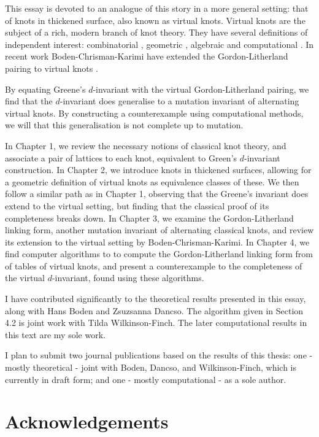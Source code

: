 \documentclass[12pt]{report}
\theoremstyle{upright}
\begin{document}
This essay is devoted to an analogue of this story in a more general setting: that of knots in thickened surface, also known as virtual knots. Virtual knots are the subject of a rich, modern branch of knot theory. They have several definitions of independent interest: combinatorial \cite{virtual-knot-theory}, geometric \cite{what-is-a-virtual-link, stable-equivalence-virtual-cobordisms}, algebraic \cite{w-knotted-i, w-knotted-ii} and computational \cite{virtual-knot-theory}. In recent work Boden-Chrisman-Karimi have extended the Gordon-Litherland pairing to virtual knots \cite{gordon-litherland-pairing-thickened-surfaces}.

By equating Greene's $d$-invariant with the virtual Gordon-Litherland pairing, we find that the $d$-invariant does generalise to a mutation invariant of alternating virtual knots. By constructing a counterexample using computational methods, we will that this generalisation is not complete up to mutation.

In Chapter 1, we review the necessary notions of classical knot theory, and associate a pair of lattices to each knot, equivalent to Green's $d$-invariant construction. In Chapter 2, we introduce knots in thickened surfaces, allowing for a geometric definition of virtual knots as equivalence classes of these. We then follow a similar path as in Chapter 1, observing that the Greene's invariant does extend to the virtual setting, but finding that the classical proof of its completeness breaks down. In Chapter 3, we examine the Gordon-Litherland linking form, another mutation invariant of alternating classical knots, and review its extension to the virtual setting by Boden-Chrisman-Karimi. In Chapter 4, we find computer algorithms to to compute the Gordon-Litherland linking form from of tables of virtual knots, and present a counterexample to the completeness of the virtual $d$-invariant, found using these algorithms.

I have contributed significantly to the theoretical results presented in this essay, along with Hans Boden and Zsuzsanna Dancso. The algorithm given in Section 4.2 is joint work with Tilda Wilkinson-Finch. The later computational results in this text are my sole work.

I plan to submit two journal publications based on the results of this thesis: one - mostly theoretical - joint with Boden, Dancso, and Wilkinson-Finch, which is currently in draft form; and one - mostly computational - as a sole author.

\chapter*{Acknowledgements}
\end{document}
